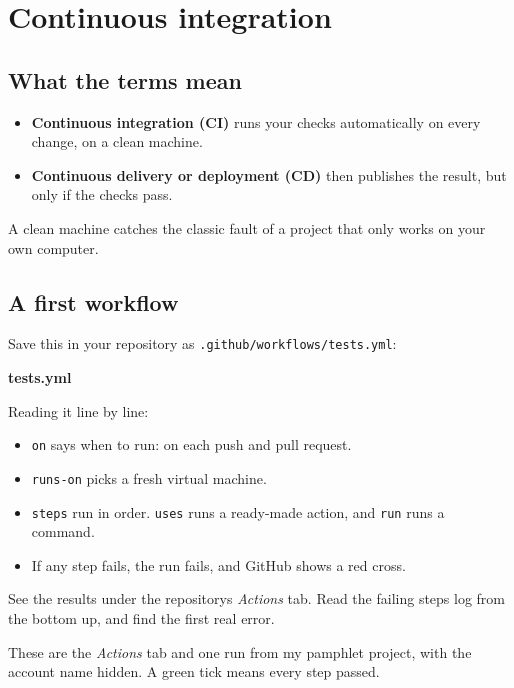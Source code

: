 \chapter{Continuous integration}
\label{ch:ci}

\section{What the terms mean}\label{what-the-terms-mean}

\begin{itemize}
\tightlist
\item
  \textbf{Continuous integration (CI)} runs your checks automatically on every change, on a clean machine.
\item
  \textbf{Continuous delivery or deployment (CD)} then publishes the result, but only if the checks pass.
\end{itemize}

A clean machine catches the classic fault of a project that only works on your own computer.

\section{A first workflow}\label{a-first-workflow}

Save this in your repository as \texttt{.github/workflows/tests.yml}:

\textbf{tests.yml}



Reading it line by line:

\begin{itemize}
\tightlist
\item
  \texttt{on} says when to run: on each push and pull request.
\item
  \texttt{runs-on} picks a fresh virtual machine.
\item
  \texttt{steps} run in order. \texttt{uses} runs a ready-made action, and \texttt{run} runs a command.
\item
  If any step fails, the run fails, and GitHub shows a red cross.
\end{itemize}

See the results under the repository\textquotesingle s \emph{Actions} tab. Read the failing step\textquotesingle s log from the bottom up, and find the first real error.

These are the \emph{Actions} tab and one run from my pamphlet project, with the account name hidden. A green tick means every step passed.

